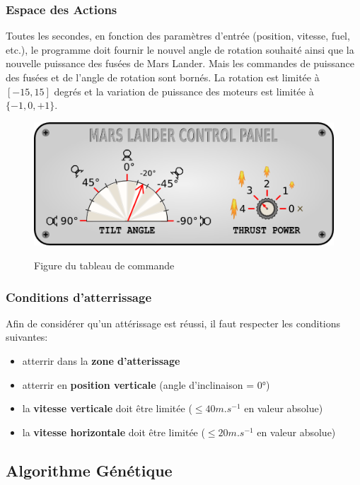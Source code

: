 \documentclass[french,a4paper,10pt,twocolumn]{article}
\begin{document}
\subsubsection{Espace des Actions}

Toutes les secondes, en fonction des paramètres d’entrée (position, vitesse, fuel, etc.), 
le programme doit fournir le nouvel angle de rotation souhaité ainsi que la nouvelle puissance des fusées de Mars Lander.
Mais les commandes de puissance des fusées et de l’angle de rotation sont bornés.
La rotation est limitée à $[-15, 15]$ degrés et la variation de puissance des moteurs est limitée à $\{-1, 0, +1\}$.

\begin{figure}[H]
    \centering
    \includegraphics[scale=0.5]{images/ControlPanel.png}
    \caption{Figure du tableau de commande}\label{fig:control_panel}
    \cite[]{codingame_mars_lander}
\end{figure}

\subsubsection{Conditions d'atterrissage}

Afin de considérer qu'un attérissage est réussi, il faut respecter les conditions suivantes:
\begin{itemize}
    \item atterrir dans la \textbf{zone d'atterissage}
    \item atterrir en \textbf{position verticale} (angle d'inclinaison = 0°)
    \item la \textbf{vitesse verticale} doit être limitée ($\le 40m.s^{-1}$ en valeur absolue)
    \item la \textbf{vitesse horizontale} doit être limitée ($\le 20m.s^{-1}$ en valeur absolue)
\end{itemize}

\subsection{Algorithme Génétique}
\end{document}
